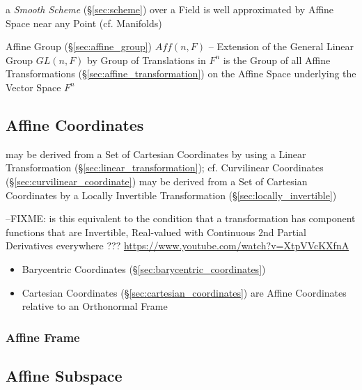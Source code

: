 \fist a \emph{Smooth Scheme} (\S\ref{sec:scheme}) over a Field is well
approximated by Affine Space near any Point (cf. Manifolds)

Affine Group (\S\ref{sec:affine_group}) $Aff(n,F)$ -- Extension of the General
Linear Group $GL(n,F)$ by Group of Translations in $F^n$ is the Group of all
Affine Transformations (\S\ref{sec:affine_transformation}) on the Affine Space
underlying the Vector Space $F^n$



\subsection{Affine Coordinates}\label{sec:affine_coordinates}


may be derived from a Set of Cartesian Coordinates by using a Linear
Transformation (\S\ref{sec:linear_transformation}); cf. Curvilinear Coordinates
(\S\ref{sec:curvilinear_coordinate}) may be derived from a Set of Cartesian
Coordinates by a Locally Invertible Transformation
(\S\ref{sec:locally_invertible})

--FIXME: is this equivalent to the condition that a transformation has component
functions that are Invertible, Real-valued with Continuous $2$nd Partial
Derivatives everywhere ??? \url{https://www.youtube.com/watch?v=XtpVVcKXfnA}

\begin{itemize}
  \item Barycentric Coordinates (\S\ref{sec:barycentric_coordinates})
  \item Cartesian Coordinates (\S\ref{sec:cartesian_coordinates}) are Affine
    Coordinates relative to an Orthonormal Frame
\end{itemize}



\subsubsection{Affine Frame}\label{sec:affine_frame}



\subsection{Affine Subspace}\label{sec:affine_subspace}

